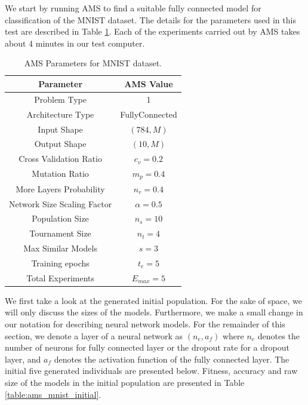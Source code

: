 \documentclass[12pt]{elsart}%
\begin{document}
We start by running AMS to find a suitable fully connected model for classification of the MNIST dataset. The details for the parameters used in this test are described in Table \ref{table:MNIST_params}. Each of the experiments carried out by AMS takes about 4 minutes in our test computer. 

\begin{table}[!htb]
\begin{center}
\begin{tabular}{| c | c |}
\hline
Parameter & AMS Value \\
\hline
Problem Type & 1 \\
Architecture Type & FullyConnected \\
Input Shape & $(784, M)$  \\
Output Shape & $(10, M)$ \\
Cross Validation Ratio & $c_v = 0.2$ \\
Mutation Ratio & $m_p = 0.4$ \\
More Layers Probability & $n_r = 0.4$ \\
Network Size Scaling Factor & $\alpha = 0.5$ \\
Population Size & $n_s = 10$ \\
Tournament Size & $n_t = 4$ \\
Max Similar Models & $s = 3$ \\
Training epochs & $t_e = 5$\\
Total Experiments & $E_{max} = 5$ \\
\hline
\end{tabular}
\end{center}
\caption{AMS Parameters for MNIST dataset.}
\label{table:MNIST_params}
\end{table}

We first take a look at the generated initial population. For the sake of space, we will only discuss the sizes of the models. Furthermore, we make a small change in our notation for describing neural network models. For the remainder of this section, we denote a layer of a neural network as $(n_e, a_f)$ where $n_e$ denotes the number of neurons for fully connected layer or the dropout rate for a dropout layer, and $a_f$ denotes the activation function of the fully connected layer. The initial five generated individuals are presented below. Fitness, accuracy and raw size of the models in the initial population are presented in Table \ref{table:ams_mnist_initial}.
\end{document}
